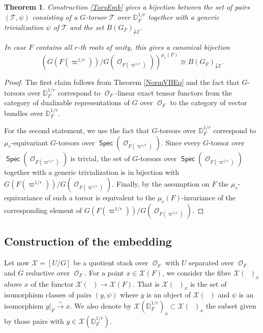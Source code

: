 \documentclass{article}
\DeclareMathOperator{\CO}{\mathcal{O}}
\def\isoto{\stackrel{\sim}{\longrightarrow}}
\DeclareMathOperator{\Spec}{\mathsf{Spec}}
\newcommand{\BZ}{{\mathbb{Z}}}
\newcommand{\CT}{{\mathcal T}}
\newcommand{\CX}{{\mathcal X}}
\newcommand{\Dr}[1][r]{\mathbb{D}_F^{1/#1}}
\DeclareMathOperator{\Dinfty}{\mathbb{D}_F^{1/\infty}}
\theoremstyle{definition}
\theoremstyle{plain}
\newtheorem{theorem}[definition]{Theorem}
\begin{document}
\begin{theorem}\label{mrdes}
    Construction \ref{TorsEmb} gives a bijection between the set of pairs $(\CT,\psi)$ consisting of a $G$-torsor $\CT$ over $\Dr$ together with a generic trivialization $\psi$ of $\CT$ and the set $B(G_F)_{\frac{1}{r}\BZ}$.

    In case $F$ contains all $r$-th roots of unity, this gives a canonical bijection
    \begin{equation*}
        (G({F(\varpi^{1/r})})/G(\CO_{F(\varpi^{1/r})}))^{\mu_r(F)} \cong B(G_F)_{\frac{1}{r}\BZ}.
    \end{equation*}

\end{theorem}
\begin{proof}
    The first claim follows from Theorem \ref{NormVBEq} and the fact that $G$-torsors over $\Dr$ correspond to $\CO_F$-linear exact tensor functors from the category of dualizable representations of $G$ over $\CO_F$ to the category of vector bundles over $\Dr$.

    For the second statement, we use the fact that $G$-torsors over $\Dr$ correspond to $\mu_r$-equivariant $G$-torsors over $\Spec(\CO_{F(\varpi^{1/r})})$. Since every $G$-torsor over $\Spec(\CO_{F(\varpi^{1/r})})$ is trivial, the set of $G$-torsors over $\Spec(\CO_{F(\varpi^{1/r})})$ together with a generic trivialization is in bijection with $G({F(\varpi^{1/r})})/G(\CO_{F(\varpi^{1/r})})$. Finally,  by the assumption on $F$ the $\mu_r$-equivariance of such a torsor is equivalent to the $\mu_r(F)$-invariance of the corresponding element of $G({F(\varpi^{1/r})})/G(\CO_{F(\varpi^{1/r})})$. 
\end{proof}
\subsection{Construction of the embedding}
 Let now $\CX=[U/G]$ be a quotient stack over $\CO_F$ with $U$ separated over $\CO_F$ and $G$ reductive over $\CO_F$. For a point $x \in \CX(F)$, we consider the fibre $\CX(\Dinfty)_x$ above $x$ of the functor $\CX(\Dinfty) \to \CX(F)$. That is $\CX(\Dinfty)_x$ is the set of isomorphism classes of pairs $(y,\psi)$ where $y$ is an object of $\CX(\Dinfty)$ and $\psi$ is an isomorphism $y|_F \isoto x$. We also denote by $\CX(\Dr)_x \subset \CX(\Dinfty)_x$ the subset given by those pairs with $y \in \CX(\Dr)$.
 
\end{document}
